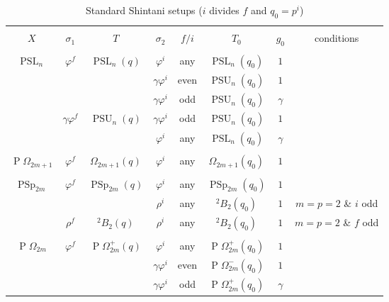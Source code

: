 \documentclass[11pt]{article}
\numberwithin{equation}{section}
\theoremstyle{shdefinition}
\theoremstyle{shplain}
\newcommand{\g}{\gamma}
\newcommand{\p}{\varphi}
\newcommand{\s}{\sigma}
\newcommand{\<}{\langle}
\renewcommand{\>}{\rangle}
\renewcommand{\:}{\colon}
\newcommand{\PSL}{\operatorname{PSL}}
\newcommand{\PSp}{\operatorname{PSp}}
\newcommand{\PSU}{\operatorname{PSU}}
\newcommand{\Om}{\Omega}
\newcommand{\POm}{\operatorname{P}\!\Om}
\begin{document}
\begin{table}
\centering
\caption{Standard Shintani setups ($i$ divides $f$ and $q_0=p^i$)} \label{tab:cases}
\begin{tabular}{cccccccc}
\hline\\[-9pt]
$X$          & $\s_1$   & $T$              & $\s_2$   & $f/i$      & $T_0$             & $g_0$     & conditions               \\[5.5pt]
\hline\\[-9pt] 
$\PSL_n$     & $\p^f$   & $\PSL_n(q)$      & $\p^i$   & any        & $\PSL_n(q_0)$     & $1$       &                          \\
             &          &                  & $\g\p^i$ & even       & $\PSU_n(q_0)$     & $1$       &                          \\
             &          &                  & $\g\p^i$ & odd        & $\PSU_n(q_0)$     & $\g$      &                          \\[5.5pt]
             & $\g\p^f$ & $\PSU_n(q)$      & $\g\p^i$ & odd        & $\PSU_n(q_0)$     & $1$       &                          \\ 
             &          &                  & $\p^i$   & any        & $\PSL_n(q_0)$     & $\g$      &                          \\[5.5pt]
\hline\\[-9pt]
$\POm_{2m+1}$& $\p^f$   & $\Om_{2m+1}(q)$  & $\p^i$   & any        & $\Om_{2m+1}(q_0)$ & $1$       &                          \\[5.5pt]
\hline\\[-9pt]
$\PSp_{2m}$  & $\p^f$   & $\PSp_{2m}(q)$   & $\p^i$   & any        & $\PSp_{2m}(q_0)$  & $1$       &                          \\
             &          &                  & $\rho^i$ & any        & ${}^2B_2(q_0)$    & $1$       & $m=p=2$ \& $i$ odd       \\[5.5pt]
             & $\rho^f$ & ${}^2B_2(q)$     & $\rho^i$ & any        & ${}^2B_2(q_0)$    & $1$       & $m=p=2$ \& $f$ odd       \\[5.5pt]
\hline\\[-9pt]
$\POm_{2m}$  & $\p^f$   & $\POm^+_{2m}(q)$ & $\p^i$   & any        & $\POm^+_{2m}(q_0)$& $1$       &                          \\
             &          &                  & $\g\p^i$ & even       & $\POm^-_{2m}(q_0)$& $1$       &                          \\                    
             &          &                  & $\g\p^i$ & odd        & $\POm^+_{2m}(q_0)$& $\g$      &                          \\                    

\end{tabular}
\end{table}
\end{document}

